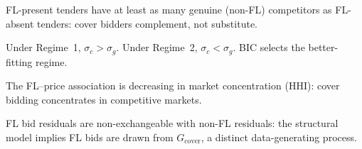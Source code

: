 \begin{prediction}
\label{pred:selection}
FL-present tenders have at least as many genuine (non-FL) competitors
as FL-absent tenders: cover bidders complement, not substitute.
\end{prediction}

\begin{prediction}
\label{pred:regime}
Under Regime~1, $\sigma_c > \sigma_g$. Under Regime~2,
$\sigma_c < \sigma_g$. BIC selects the better-fitting regime.
\end{prediction}

\begin{prediction}
\label{pred:market}
The FL--price association is decreasing in market concentration (HHI):
cover bidding concentrates in competitive markets.
\end{prediction}

\begin{prediction}
\label{pred:exchange}
FL bid residuals are non-exchangeable with non-FL residuals:
the structural model implies FL bids are drawn from $G_{\text{cover}}$,
a distinct data-generating process.
\end{prediction}
